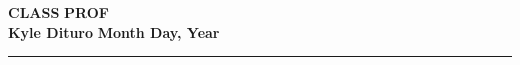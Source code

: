 \documentclass[12pt, twosided]{article}
\begin{document}
\noindent \textbf{CLASS} \hfill \textbf{PROF} \\
\textbf{Kyle Dituro} \hfill \textbf{Month Day\tht, Year}\hrule
\vspace{.2in}
\end{document}
